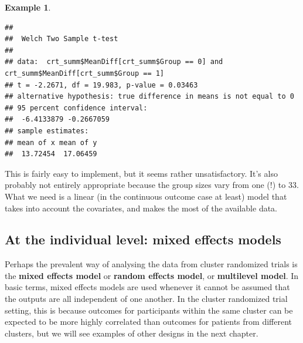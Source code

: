 \documentclass[
  openany]{book}
\newenvironment{Shaded}{\begin{snugshade}}{\end{snugshade}}
\newcommand{\AttributeTok}[1]{\textcolor[rgb]{0.13,0.29,0.53}{#1}}
\newcommand{\DecValTok}[1]{\textcolor[rgb]{0.00,0.00,0.81}{#1}}
\newcommand{\FunctionTok}[1]{\textcolor[rgb]{0.13,0.29,0.53}{\textbf{#1}}}
\newcommand{\NormalTok}[1]{#1}
\newcommand{\SpecialCharTok}[1]{\textcolor[rgb]{0.81,0.36,0.00}{\textbf{#1}}}
\newcommand{\StringTok}[1]{\textcolor[rgb]{0.31,0.60,0.02}{#1}}
\theoremstyle{definition}
\theoremstyle{definition}
\newtheorem{example}{Example}[chapter]
\theoremstyle{definition}
\theoremstyle{definition}
\theoremstyle{remark}
\begin{document}
\begin{example}
\begin{Shaded}
\end{Shaded}

\begin{verbatim}
## 
##  Welch Two Sample t-test
## 
## data:  crt_summ$MeanDiff[crt_summ$Group == 0] and crt_summ$MeanDiff[crt_summ$Group == 1]
## t = -2.2671, df = 19.983, p-value = 0.03463
## alternative hypothesis: true difference in means is not equal to 0
## 95 percent confidence interval:
##  -6.4133879 -0.2667059
## sample estimates:
## mean of x mean of y 
##  13.72454  17.06459
\end{verbatim}

\end{example}

This is fairly easy to implement, but it seems rather unsatisfactory. It's also probably not entirely appropriate because the group sizes vary from one (!) to 33. What we need is a linear (in the continuous outcome case at least) model that takes into account the covariates, and makes the most of the available data.

\subsection{At the individual level: mixed effects models}\label{at-the-individual-level-mixed-effects-models}

Perhaps the prevalent way of analysing the data from cluster randomized trials is the \textbf{mixed effects model} or \textbf{random effects model}, or \textbf{multilevel model}. In basic terms, mixed effects models are used whenever it cannot be assumed that the outputs are all independent of one another. In the cluster randomized trial setting, this is because outcomes for participants within the same cluster can be expected to be more highly correlated than outcomes for patients from different clusters, but we will see examples of other designs in the next chapter.
\end{document}
